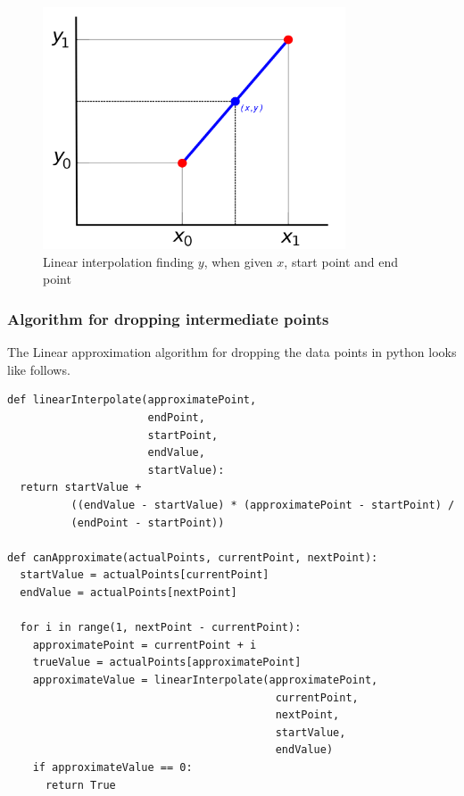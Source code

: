 \documentclass[12pt]{article}
\begin{document}
{\begin{figure}[H]
  \centering
  \includegraphics[width=0.8\textwidth]{linear_interpolation}
  \caption{Linear interpolation finding $y$, when given $x$, start point and end point ~\cite{linear_interpolation}}
  \label{fig:linear_interpolation}
\end{figure}

\subsubsection{Algorithm for dropping intermediate points}

The Linear approximation algorithm for dropping the data points in python looks like follows.

\begin{verbatim}
def linearInterpolate(approximatePoint,
                      endPoint,
                      startPoint,
                      endValue,
                      startValue):
  return startValue +
          ((endValue - startValue) * (approximatePoint - startPoint) /
          (endPoint - startPoint))

def canApproximate(actualPoints, currentPoint, nextPoint):
  startValue = actualPoints[currentPoint]
  endValue = actualPoints[nextPoint]

  for i in range(1, nextPoint - currentPoint):
    approximatePoint = currentPoint + i
    trueValue = actualPoints[approximatePoint]
    approximateValue = linearInterpolate(approximatePoint,
                                          currentPoint,
                                          nextPoint,
                                          startValue,
                                          endValue)
    if approximateValue == 0:
      return True


\end{verbatim}}
\end{document}
